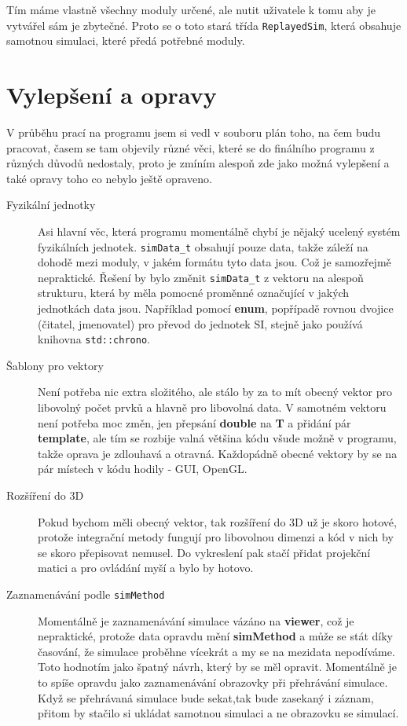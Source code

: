 Tím máme vlastně všechny moduly určené, ale nutit uživatele k tomu aby je vytvářel sám je zbytečné. Proto se o toto stará třída \texttt{ReplayedSim}, která obsahuje samotnou simulaci, které předá potřebné moduly.
\section{Vylepšení a opravy}
V průběhu prací na programu jsem si vedl v souboru plán toho, na čem budu pracovat, časem se tam objevily různé věci, které se do finálního programu z různých důvodů nedostaly, proto je zmíním alespoň zde jako možná vylepšení a také opravy toho co nebylo ještě opraveno.

\begin{description}
	\item[Fyzikální jednotky] Asi hlavní věc, která programu momentálně chybí je nějaký ucelený systém fyzikálních jednotek. \texttt{simData\_t} obsahují pouze data, takže záleží na dohodě mezi moduly, v jakém formátu tyto data jsou. Což je samozřejmě nepraktické. Řešení by bylo změnit \texttt{simData\_t} z vektoru na alespoň strukturu, která by měla pomocné proměnné označující v jakých jednotkách data jsou. Například pomocí \textbf{enum}, popřípadě rovnou dvojice (čitatel, jmenovatel) pro převod do jednotek SI, stejně jako používá knihovna \texttt{std::chrono}.
	\item[Šablony pro vektory] Není potřeba nic extra složitého, ale stálo by za to mít obecný vektor pro libovolný počet prvků a hlavně pro libovolná data. V samotném vektoru není potřeba moc změn, jen přepsání \textbf{double} na \textbf{T} a přidání pár \textbf{template}, ale tím se rozbije valná většina kódu všude možně v programu, takže oprava je zdlouhavá a otravná.
	Každopádně obecné vektory by se na pár místech v kódu hodily - GUI, OpenGL.
	\item[Rozšíření do 3D] Pokud bychom měli obecný vektor, tak rozšíření do 3D už je skoro hotové, protože integrační metody fungují pro libovolnou dimenzi a kód v nich by se skoro přepisovat nemusel. Do vykreslení pak stačí přidat projekční matici a  pro ovládání myší a bylo by hotovo.
	\item[Zaznamenávání podle \texttt{simMethod}] Momentálně je zaznamenávání simulace vázáno na \textbf{viewer}, což je nepraktické, protože data opravdu mění \textbf{simMethod} a může se stát díky časování, že simulace proběhne vícekrát a my se na mezidata nepodíváme. Toto hodnotím jako špatný návrh, který by se měl opravit. Momentálně je to spíše opravdu jako zaznamenávání obrazovky při přehrávání simulace. Když se přehrávaná simulace bude sekat,tak bude zasekaný i záznam, přitom by stačilo si ukládat samotnou simulaci a ne obrazovku se simulací.

\end{description}
